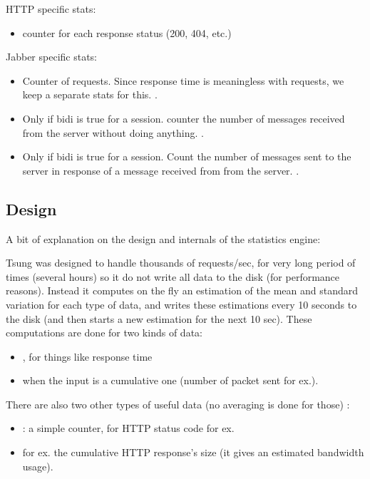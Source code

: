 \documentclass{TSUNG-en}
\begin{document}
HTTP specific stats:
\begin{itemize}
\item counter for each response status (200, 404, etc.)
\end{itemize}

Jabber specific stats:
\begin{itemize}
\item {} Counter of  requests. Since
  response time is meaningless with 
  requests, we keep a separate stats for this. .
\item {} Only if bidi is true for a
  session. counter the number of messages received from the server
  without doing anything.  .
\item {} Only if bidi is true for a
  session. Count the number of messages sent to the server in response
  of a message received from from the server. .
\end{itemize}

\subsection{Design}

A bit of explanation on the design and internals of the statistics engine:

Tsung was designed to handle thousands of requests/sec, for very
long period of times (several hours) so it do not write all data to
the disk (for performance reasons). Instead it computes on the fly an
estimation of the mean and standard variation for each type of data,
and writes these estimations every 10 seconds to the disk (and then
starts a new estimation for the next 10 sec). These computations are
done for two kinds of data:
\begin{itemize}
\item {}, for things like response time
\item {} when the input is a cumulative one (number of
packet sent for ex.).
\end{itemize}

There are also two other types of useful data (no averaging is done for
those) :
\begin{itemize}
\item {}: a simple counter, for HTTP status code for ex.
\item {} for ex. the cumulative HTTP response's size (it gives an
estimated bandwidth usage).
\end{itemize}
\end{document}
